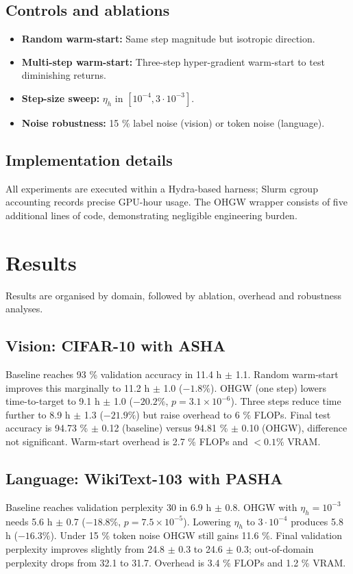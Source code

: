 \documentclass{article}
\begin{document}
\subsection{Controls and ablations}
\begin{itemize}
  \item \textbf{Random warm-start:} Same step magnitude but isotropic direction.
  \item \textbf{Multi-step warm-start:} Three-step hyper-gradient warm-start to test diminishing returns.
  \item \textbf{Step-size sweep:} \(\eta_h\) in \([10^{-4}, 3\cdot 10^{-3}]\).
  \item \textbf{Noise robustness:} 15 \% label noise (vision) or token noise (language).
\end{itemize}

\subsection{Implementation details}
All experiments are executed within a Hydra-based harness; Slurm cgroup accounting records precise GPU-hour usage. The OHGW wrapper consists of five additional lines of code, demonstrating negligible engineering burden.

\section{Results}
Results are organised by domain, followed by ablation, overhead and robustness analyses.

\subsection{Vision: CIFAR-10 with ASHA}
Baseline reaches 93 \% validation accuracy in 11.4 h \(\pm\) 1.1. Random warm-start improves this marginally to 11.2 h \(\pm\) 1.0 (\(-1.8 \%\)). OHGW (one step) lowers time-to-target to 9.1 h \(\pm\) 1.0 (\(-20.2 \%\), \(p = 3.1 \times 10^{-6}\)). Three steps reduce time further to 8.9 h \(\pm\) 1.3 (\(-21.9 \%\)) but raise overhead to 6 \% FLOPs. Final test accuracy is 94.73 \% \(\pm\) 0.12 (baseline) versus 94.81 \% \(\pm\) 0.10 (OHGW), difference not significant. Warm-start overhead is 2.7 \% FLOPs and \(<0.1 \%\) VRAM.

\subsection{Language: WikiText-103 with PASHA}
Baseline reaches validation perplexity 30 in 6.9 h \(\pm\) 0.8. OHGW with \(\eta_h = 10^{-3}\) needs 5.6 h \(\pm\) 0.7 (\(-18.8 \%\), \(p = 7.5 \times 10^{-5}\)). Lowering \(\eta_h\) to \(3\cdot 10^{-4}\) produces 5.8 h (\(-16.3 \%\)). Under 15 \% token noise OHGW still gains 11.6 \%. Final validation perplexity improves slightly from 24.8 \(\pm\) 0.3 to 24.6 \(\pm\) 0.3; out-of-domain perplexity drops from 32.1 to 31.7. Overhead is 3.4 \% FLOPs and 1.2 \% VRAM.
\end{document}
